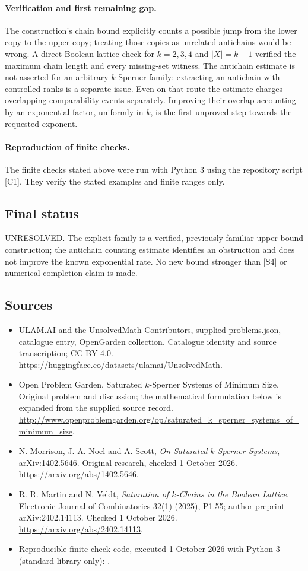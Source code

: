 \documentclass[11pt,a4paper]{article}
\begin{document}
\paragraph{Verification and first remaining gap.}
The construction's chain bound explicitly counts a possible jump from
the lower copy to the upper copy; treating those copies as unrelated
antichains would be wrong. A direct Boolean-lattice check for
$k=2,3,4$ and $|X|=k+1$ verified the maximum chain length and
every missing-set witness. The antichain estimate is not asserted for
an arbitrary $k$-Sperner family: extracting an antichain with controlled
ranks is a separate issue. Even on that route the estimate charges
overlapping comparability events separately. Improving their overlap
accounting by an exponential factor, uniformly in $k$, is the first
unproved step towards the requested exponent.

\paragraph{Reproduction of finite checks.}
The finite checks stated above were run with Python 3 using the repository
script [C1]. They verify the stated examples and finite ranges only.

\subsection{Final status}
UNRESOLVED. The explicit family is a verified, previously familiar
upper-bound construction; the antichain counting estimate identifies
an obstruction and does not improve the known exponential rate.
No new bound stronger than [S4] or numerical completion claim is made.

\subsection{Sources}
\begin{itemize}
\item[S1] ULAM.AI and the UnsolvedMath Contributors, supplied problems.json, catalogue entry, OpenGarden collection. Catalogue identity and source transcription; CC BY 4.0.
\url{https://huggingface.co/datasets/ulamai/UnsolvedMath}.
\item[S2] Open Problem Garden, Saturated $k$-Sperner Systems of Minimum Size. Original problem and discussion; the mathematical formulation below is expanded from the supplied source record.
\url{http://www.openproblemgarden.org/op/saturated_k_sperner_systems_of_minimum_size}.
\item[S3] N. Morrison, J. A. Noel and A. Scott, \emph{On Saturated $k$-Sperner Systems}, arXiv:1402.5646. Original research, checked 1 October 2026.
\url{https://arxiv.org/abs/1402.5646}.
\item[S4] R. R. Martin and N. Veldt, \emph{Saturation of $k$-Chains in the Boolean Lattice}, Electronic Journal of Combinatorics 32(1) (2025), P1.55; author preprint arXiv:2402.14113. Checked 1 October 2026.
\url{https://arxiv.org/abs/2402.14113}.
\item[C1] Reproducible finite-check code, executed 1 October 2026 with Python 3 (standard library only):
.
\end{itemize}
\end{document}
